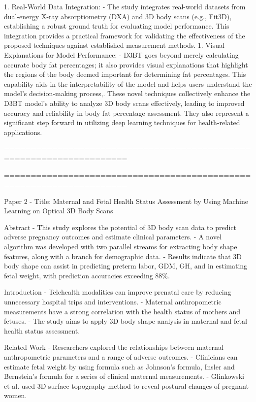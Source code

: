 \documentclass[conference, 12pt]{IEEEtran}
\begin{document}
1. Real-World Data Integration:
- The study integrates real-world datasets from dual-energy X-ray absorptiometry (DXA) and 3D body scans (e.g., Fit3D), establishing a robust ground truth for evaluating model performance. This integration provides a practical framework for validating the effectiveness of the proposed techniques against established measurement methods.
1. Visual Explanations for Model Performance:
- D3BT goes beyond merely calculating accurate body fat percentages; it also provides visual explanations that highlight the regions of the body deemed important for determining fat percentages. This capability aids in the interpretability of the model and helps users understand the model's decision-making process,.
These novel techniques collectively enhance the D3BT model's ability to analyze 3D body scans effectively, leading to improved accuracy and reliability in body fat percentage assessment. They also represent a significant step forward in utilizing deep learning techniques for health-related applications.

=====================================================================




=====================================================================

Paper 2 - Title: Maternal and Fetal Health Status Assessment by Using Machine Learning on Optical 3D Body Scans


Abstract
- This study explores the potential of 3D body scan data to predict adverse pregnancy outcomes and estimate clinical parameters.
- A novel algorithm was developed with two parallel streams for extracting body shape features, along with a branch for demographic data.
- Results indicate that 3D body shape can assist in predicting preterm labor, GDM, GH, and in estimating fetal weight, with prediction accuracies exceeding 88\%.

Introduction
- Telehealth modalities can improve prenatal care by reducing unnecessary hospital trips and interventions.
- Maternal anthropometric measurements have a strong correlation with the health status of mothers and fetuses.
- The study aims to apply 3D body shape analysis in maternal and fetal health status assessment.

Related Work
- Researchers explored the relationships between maternal anthropometric parameters and a range of adverse outcomes.
- Clinicians can estimate fetal weight by using formula such as Johnson’s formula, Insler and Bernstein’s formula for a series of clinical maternal measurements.
- Glinkowski et al. used 3D surface topography method to reveal postural changes of pregnant women.
\end{document}
